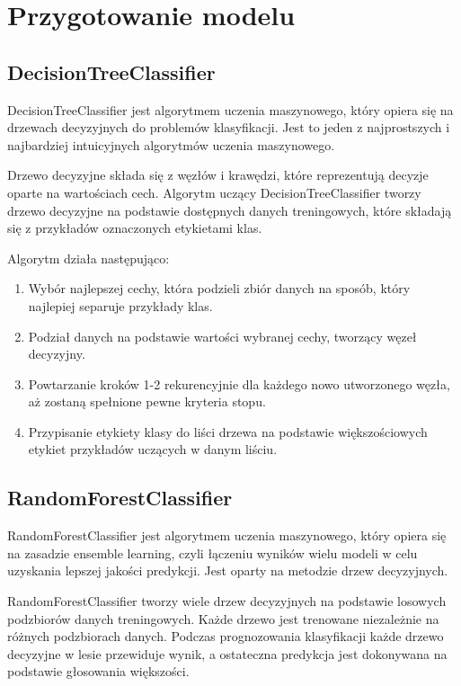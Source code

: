\section{Przygotowanie modelu}

\subsection{DecisionTreeClassifier}
\label{DTC}
\hspace{\parindent}
DecisionTreeClassifier jest algorytmem uczenia maszynowego, który opiera się na drzewach decyzyjnych do problemów klasyfikacji. Jest to jeden z najprostszych i najbardziej intuicyjnych algorytmów uczenia maszynowego.

Drzewo decyzyjne składa się z węzłów i krawędzi, które reprezentują decyzje oparte na wartościach cech. Algorytm uczący DecisionTreeClassifier tworzy drzewo decyzyjne na podstawie dostępnych danych treningowych, które składają się z przykładów oznaczonych etykietami klas.

Algorytm działa następująco:
\begin{enumerate}
    \item Wybór najlepszej cechy, która podzieli zbiór danych na sposób, który najlepiej separuje przykłady klas.
    \item Podział danych na podstawie wartości wybranej cechy, tworzący węzeł decyzyjny.
    \item Powtarzanie kroków 1-2 rekurencyjnie dla każdego nowo utworzonego węzła, aż zostaną spełnione pewne kryteria stopu.
    \item Przypisanie etykiety klasy do liści drzewa na podstawie większościowych etykiet przykładów uczących w danym liściu.
\end{enumerate}

\subsection{RandomForestClassifier}
\label{RFC}
\hspace{\parindent}
RandomForestClassifier jest algorytmem uczenia maszynowego, który opiera się na zasadzie ensemble learning, czyli łączeniu wyników wielu modeli w celu uzyskania lepszej jakości predykcji. Jest oparty na metodzie drzew decyzyjnych.

RandomForestClassifier tworzy wiele drzew decyzyjnych na podstawie losowych podzbiorów danych treningowych. Każde drzewo jest trenowane niezależnie na różnych podzbiorach danych. Podczas prognozowania klasyfikacji każde drzewo decyzyjne w lesie przewiduje wynik, a ostateczna predykcja jest dokonywana na podstawie głosowania większości.

